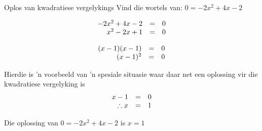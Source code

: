 \begin{wex}{Oplos van kwadratiese vergelykings }
{ Vind die wortels van: $0=-2{x}^{2}+4x-2$}
{

\begin{equation*}
\begin{array}{ccc}\hfill -2{x}^{2}+4x-2& =& 0\hfill \\ \hfill {x}^{2}-2x+1& =& 0\hfill \end{array}
\end{equation*}


\begin{equation*}
\begin{array}{ccc} \hfill (x-1)(x-1) &=& 0 \hfill \\
\hfill (x-1)^{2} &=&0 \hfill 
\end{array}
\end{equation*}

Hierdie is 'n voorbeeld van 'n spesiale situasie waar daar net een oplossing vir die kwadratiese vergelyking is
\begin{equation*}
\begin{array}{ccc} \hfill x -1 &=& 0 \hfill \\
\hfill \therefore x &=&1 \hfill 
\end{array}
\end{equation*}


 
Die oplossing van $0=-2{x}^{2}+4x-2$ is $x=1$
}
\end{wex}


